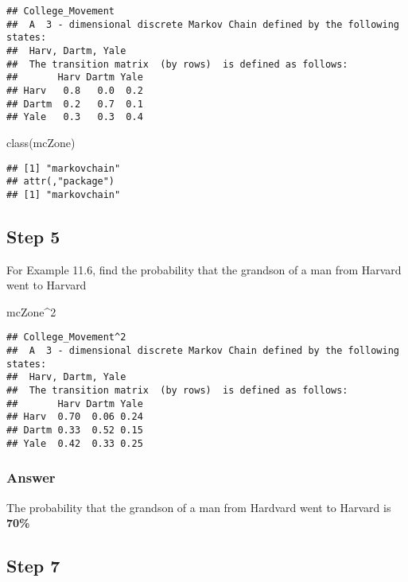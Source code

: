 \documentclass[
]{article}
\newenvironment{Shaded}{\begin{snugshade}}{\end{snugshade}}
\newcommand{\DecValTok}[1]{\textcolor[rgb]{0.00,0.00,0.81}{#1}}
\newcommand{\FunctionTok}[1]{\textcolor[rgb]{0.00,0.00,0.00}{#1}}
\newcommand{\NormalTok}[1]{#1}
\newcommand{\SpecialCharTok}[1]{\textcolor[rgb]{0.00,0.00,0.00}{#1}}
\begin{document}
\begin{verbatim}
## College_Movement 
##  A  3 - dimensional discrete Markov Chain defined by the following states: 
##  Harv, Dartm, Yale 
##  The transition matrix  (by rows)  is defined as follows: 
##       Harv Dartm Yale
## Harv   0.8   0.0  0.2
## Dartm  0.2   0.7  0.1
## Yale   0.3   0.3  0.4
\end{verbatim}

\begin{Shaded}
\begin{Highlighting}[]
\FunctionTok{class}\NormalTok{(mcZone)}
\end{Highlighting}
\end{Shaded}

\begin{verbatim}
## [1] "markovchain"
## attr(,"package")
## [1] "markovchain"
\end{verbatim}

\hypertarget{step-5}{%
\subsection{Step 5}\label{step-5}}

For Example 11.6, find the probability that the grandson of a man from
Harvard went to Harvard

\begin{Shaded}
\begin{Highlighting}[]
\NormalTok{mcZone}\SpecialCharTok{\^{}}\DecValTok{2}
\end{Highlighting}
\end{Shaded}

\begin{verbatim}
## College_Movement^2 
##  A  3 - dimensional discrete Markov Chain defined by the following states: 
##  Harv, Dartm, Yale 
##  The transition matrix  (by rows)  is defined as follows: 
##       Harv Dartm Yale
## Harv  0.70  0.06 0.24
## Dartm 0.33  0.52 0.15
## Yale  0.42  0.33 0.25
\end{verbatim}

\hypertarget{answer}{%
\subsubsection{Answer}\label{answer}}

The probability that the grandson of a man from Hardvard went to Harvard
is \textbf{70\%}

\hypertarget{step-7}{%
\subsection{Step 7}\label{step-7}}
\end{document}
